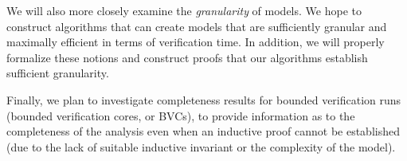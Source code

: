 We will also more closely examine the {\em granularity} of models.  We hope to construct algorithms that can create models that are sufficiently granular and maximally efficient in terms of verification time.  In addition, we will properly formalize these notions and construct proofs that our algorithms establish sufficient granularity.

Finally, we plan to investigate completeness results for bounded verification runs (bounded verification cores, or BVCs), to provide information as to the completeness of the analysis even when an inductive proof cannot be established (due to the lack of suitable inductive invariant or the complexity of the model).

